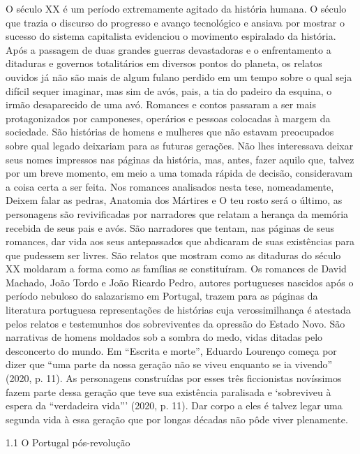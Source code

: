 \documentclass[../DISSERTACAO_MAIN.tex]{subfiles}
\begin{document}
O século XX é um período extremamente agitado da história humana. O século que trazia o discurso do progresso e avanço tecnológico e ansiava por mostrar o sucesso do sistema capitalista evidenciou o movimento espiralado da história. Após a passagem de duas grandes guerras devastadoras e o enfrentamento a ditaduras e governos totalitários em diversos pontos do planeta, os relatos ouvidos já não são mais de algum fulano perdido em um tempo sobre o qual seja difícil sequer imaginar, mas sim de avós,  pais, a tia do padeiro da esquina, o irmão desaparecido de uma avó. Romances e contos passaram a ser mais protagonizados por camponeses, operários e pessoas colocadas à margem da sociedade. São histórias de homens e mulheres que não estavam preocupados sobre qual legado deixariam para as futuras gerações. Não lhes interessava deixar seus nomes impressos nas páginas da história, mas, antes, fazer aquilo que, talvez por um breve momento, em meio a uma tomada rápida de decisão, consideravam a coisa certa a ser feita. 
Nos romances analisados nesta tese, nomeadamente, Deixem falar as pedras, Anatomia dos Mártires e O teu rosto será o último, as personagens são revivificadas por narradores que relatam a herança da memória recebida de seus pais e avós. São narradores que tentam, nas páginas de seus romances, dar vida aos seus antepassados que abdicaram de suas existências para que pudessem ser livres. São relatos que mostram como as ditaduras do século XX moldaram a forma como as famílias se constituíram. Os romances de David Machado, João Tordo e João Ricardo Pedro, autores portugueses nascidos após o período nebuloso do salazarismo em Portugal, trazem para as páginas da literatura portuguesa representações de histórias cuja verossimilhança é atestada pelos relatos e testemunhos dos sobreviventes da opressão do Estado Novo. São narrativas de homens moldados sob a sombra do medo, vidas ditadas pelo desconcerto do mundo. Em “Escrita e morte”, Eduardo Lourenço começa por dizer que “uma parte da nossa geração não se viveu enquanto se ia vivendo” (2020, p. 11). As personagens construídas por esses três ficcionistas novíssimos fazem parte dessa geração que teve sua existência paralisada e ‘sobreviveu à espera da “verdadeira vida”’ (2020, p. 11).  Dar corpo a eles é talvez legar uma segunda vida à essa geração que por longas décadas não pôde viver plenamente. 


1.1 O Portugal pós-revolução
\end{document}
